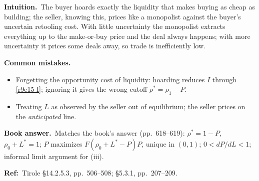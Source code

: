 \documentclass[11pt,a4paper]{article}
\newcommand{\intuition}{\par\medskip\noindent\textbf{Intuition.}~}
\newcommand{\bookans}{\par\medskip\noindent\textbf{Book answer.}~}
\newcommand{\refbib}{\par\smallskip\noindent\textbf{Ref:}~}
\newcommand{\pitfalls}{\par\medskip\noindent\textbf{Common mistakes.}}
\begin{document}
\intuition The buyer hoards exactly the liquidity that makes buying as cheap as building; the seller,
knowing this, prices like a monopolist against the buyer's uncertain retooling cost. With little
uncertainty the monopolist extracts everything up to the make-or-buy price and the deal always
happens; with more uncertainty it prices some deals away, so trade is inefficiently low.
\pitfalls
\begin{itemize}
  \item Forgetting the opportunity cost of liquidity: hoarding reduces $I$ through \eqref{r9e15-I}; ignoring it gives the wrong cutoff $\rho^*=\rho_1-P$.
  \item Treating $L$ as observed by the seller out of equilibrium; the seller prices on the \emph{anticipated} line.
\end{itemize}
\bookans Matches the book's answer (pp.~618--619): $\rho^*=1-P$, $\rho_0+L^*=1$; $P$ maximizes $F(\rho_0+L^*-P)P$,
unique in $(0,1)$; $0<dP/dL<1$; informal limit argument for (iii).
\refbib{Tirole \S14.2.5.3, pp.~506--508; \S5.3.1, pp.~207--209.}
\end{document}
